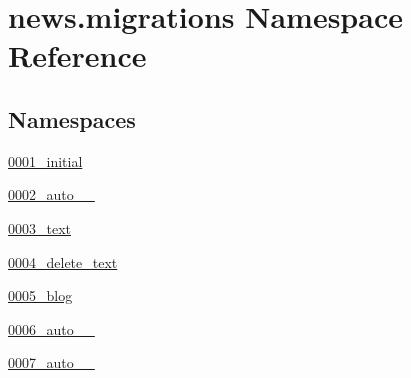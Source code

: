 \hypertarget{namespacenews_1_1migrations}{}\section{news.\+migrations Namespace Reference}
\label{namespacenews_1_1migrations}
\subsection*{Namespaces}
\begin{DoxyCompactItemize}
\item 
 \mbox{\hyperlink{namespacenews_1_1migrations_1_10001__initial}{0001\+\_\+initial}}
\item 
 \mbox{\hyperlink{namespacenews_1_1migrations_1_10002__auto__20181009__2006}{0002\+\_\+auto\+\_\+\_}}
\item 
 \mbox{\hyperlink{namespacenews_1_1migrations_1_10003__text}{0003\+\_\+text}}
\item 
 \mbox{\hyperlink{namespacenews_1_1migrations_1_10004__delete__text}{0004\+\_\+delete\+\_\+text}}
\item 
 \mbox{\hyperlink{namespacenews_1_1migrations_1_10005__blog}{0005\+\_\+blog}}
\item 
 \mbox{\hyperlink{namespacenews_1_1migrations_1_10006__auto__20181013__0120}{0006\+\_\+auto\+\_\+\_}}
\item 
 \mbox{\hyperlink{namespacenews_1_1migrations_1_10007__auto__20181013__0120}{0007\+\_\+auto\+\_\+\_}}
\end{DoxyCompactItemize}
